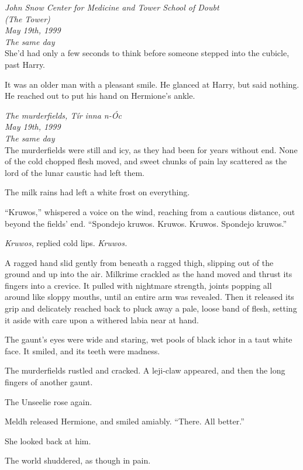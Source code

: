 \mybreak
\pagebreak

\emph{John Snow Center for Medicine and Tower School of Doubt\\
(The Tower)}\\
\emph{May 19th, 1999}\\
\emph{The same day}\\

She'd had only a few seconds to think before someone stepped into the
cubicle, past Harry.

It was an older man with a pleasant smile. He glanced at Harry, but said
nothing. He reached out to put his hand on Hermione's ankle.

\mybreak

\emph{The murderfields, Tír inna n-Óc}\\
\emph{May 19th, 1999}\\
\emph{The same day}\\

The murderfields were still and icy, as they had been for years without
end. None of the cold chopped flesh moved, and sweet chunks of pain lay
scattered as the lord of the lunar caustic had left them.

The milk rains had left a white frost on everything.

``Kruwos,'' whispered a voice on the wind, reaching from a cautious
distance, out beyond the fields' end. ``Spondejo kruwos. Kruwos. Kruwos.
Spondejo kruwos.''

\emph{Kruwos}, replied cold lips. \emph{Kruwos.}

A ragged hand slid gently from beneath a ragged thigh, slipping out of
the ground and up into the air. Milkrime crackled as the hand moved and
thrust its fingers into a crevice. It pulled with nightmare strength,
joints popping all around like sloppy mouths, until an entire arm was
revealed. Then it released its grip and delicately reached back to pluck
away a pale, loose band of flesh, setting it aside with care upon a
withered labia near at hand.

The gaunt's eyes were wide and staring, wet pools of black ichor in a
taut white face. It smiled, and its teeth were madness.

The murderfields rustled and cracked. A leji-claw appeared, and then the
long fingers of another gaunt.

The Unseelie rose again.

\mybreak

Meldh released Hermione, and smiled amiably. ``There. All better.''

She looked back at him.

The world shuddered, as though in pain.
